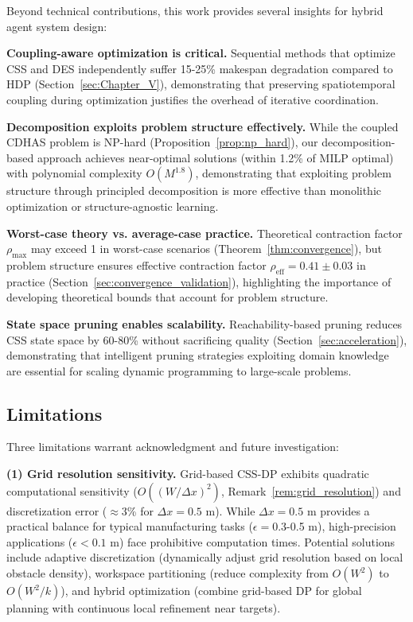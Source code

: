 \documentclass[manuscript,screen,review]{acmart}
\begin{document}
Beyond technical contributions, this work provides several insights for hybrid
agent system design:

\textbf{Coupling-aware optimization is critical.} Sequential methods that 
optimize CSS and DES independently suffer 15-25\% makespan degradation compared 
to HDP (Section~\ref{sec:Chapter_V}), demonstrating that preserving spatiotemporal 
coupling during optimization justifies the overhead of iterative coordination.

\textbf{Decomposition exploits problem structure effectively.} While the coupled 
CDHAS problem is NP-hard (Proposition~\ref{prop:np_hard}), our decomposition-based 
approach achieves near-optimal solutions (within 1.2\% of MILP optimal) with 
polynomial complexity $O(M^{1.8})$, demonstrating that exploiting problem 
structure through principled decomposition is more effective than monolithic 
optimization or structure-agnostic learning.

\textbf{Worst-case theory vs. average-case practice.} Theoretical contraction 
factor $\rho_{\max}$ may exceed 1 in worst-case scenarios (Theorem~\ref{thm:convergence}), 
but problem structure ensures effective contraction factor $\rho_{\text{eff}} = 0.41 \pm 0.03$ 
in practice (Section~\ref{sec:convergence_validation}), highlighting the importance 
of developing theoretical bounds that account for problem structure.

\textbf{State space pruning enables scalability.} Reachability-based pruning 
reduces CSS state space by 60-80\% without sacrificing quality 
(Section~\ref{sec:acceleration}), demonstrating that intelligent pruning 
strategies exploiting domain knowledge are essential for scaling dynamic 
programming to large-scale problems.

\subsection{Limitations}
\label{sec:limitations}
Three limitations warrant acknowledgment and future investigation:

\textbf{(1) Grid resolution sensitivity.} Grid-based CSS-DP exhibits quadratic 
computational sensitivity ($O((W/\Delta x)^2)$, Remark~\ref{rem:grid_resolution}) 
and discretization error ($\approx 3$\% for $\Delta x = 0.5$ m). While 
$\Delta x = 0.5$ m provides a practical balance for typical manufacturing tasks 
($\epsilon = 0.3$-0.5 m), high-precision applications ($\epsilon < 0.1$ m) 
face prohibitive computation times. Potential solutions include adaptive 
discretization (dynamically adjust grid resolution based on local obstacle 
density), workspace partitioning (reduce complexity from $O(W^2)$ to $O(W^2/k)$), 
and hybrid optimization (combine grid-based DP for global planning with 
continuous local refinement near targets).
\end{document}

